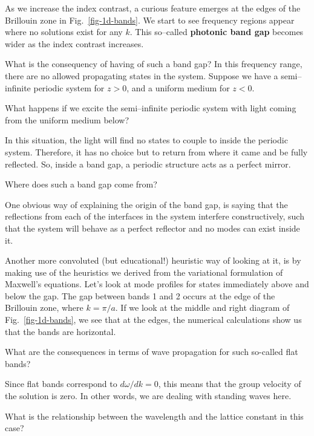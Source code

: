 As we increase the index contrast, a curious feature emerges at the edges of the Brillouin zone in Fig.~\ref{fig-1d-bands}. We start to see frequency regions appear where no solutions exist for any $k$. This so--called \textbf{photonic band gap} becomes wider as the index contrast increases.

What is the consequency of having of such a band gap? In this frequency range, there are no allowed propagating states in the system. Suppose we have a semi--infinite periodic system for $z>0$, and a uniform medium for $z<0$.

\begin{cue}
What happens if we excite the semi--infinite periodic system with light coming from the uniform medium below?
\end{cue}

In this situation, the light will find no states to couple to inside the periodic system. Therefore, it has no choice but to return from where it came and be fully reflected. So, inside a band gap, a periodic structure acts as a perfect mirror.

\begin{cue}
Where does such a band gap come from?
\end{cue}

One obvious way of explaining the origin of the band gap, is saying that the reflections from each of the interfaces in the system interfere constructively, such that the system will behave as a perfect reflector and no modes can exist inside it.

Another more convoluted (but educational!) heuristic way of looking at it, is by making use of the heuristics we derived from the variational formulation of Maxwell's equations. Let's look at mode profiles for states immediately above and below the gap. The gap between bands 1 and 2 occurs at the edge of the Brillouin zone, where $k = \pi / a$. If we look at the middle and right diagram of Fig.~\ref{fig-1d-bands}, we see that at the edges, the numerical calculations show us that the bands are horizontal.

\begin{cue}
What are the consequences in terms of wave propagation for such so-called flat bands?
\end{cue}

Since flat bands correspond to $d \omega / dk=0$, this means that the group velocity of the solution is zero. In other words, we are dealing with standing waves here.

\begin{cue}
What is the relationship between the wavelength and the lattice constant in this case?
\end{cue}

